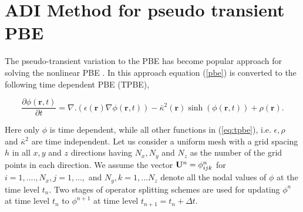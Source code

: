 \section{ADI Method for pseudo transient PBE}
\label{sec:adi-method}

The pseudo-transient variation to the PBE has become popular approach for solving the nonlinear PBE \cite{Sayyed-Ahmad2004, Shestakov2002, Zhao2011, zhao_operator_2014}. In this approach equation (\ref{pbe}) is converted to the following time dependent PBE (TPBE),

\begin{equation}
			\frac{\partial \phi(\textbf{r},t)}{\partial t}=\nabla.(\epsilon(\textbf{r})\nabla \phi(\textbf{r},t))-\bar\kappa^2(\textbf{r}) \sinh (\phi(\textbf{r},t))+\rho(\textbf{r}).\label{eq:tpbe} %
\end{equation}


Here only $\phi$ is time dependent, while all other functions in (\ref{eq:tpbe}), i.e. $\epsilon,\rho$ and $\bar\kappa^2 $ are time independent. Let us consider a uniform mesh with a grid spacing $h$ in all $x,y$ and $z$ directions having $N_x,N_y$ and $N_z$ as the number of the grid points in each direction. We assume the vector ${{\bf U}^n = \phi^n_{ijk}}$ for $i=1,...., N_x,j=1,...,$ and $N_y,k=1,...N_z$ denote all the nodal values of $\phi$ at the time level $t_n$. Two stages of operator splitting schemes are used for updating $\phi^n$ at time level $t_n$ to $\phi^{n+1}$ at time level $t_{n+1}=t_n+ \Delta t $. 


